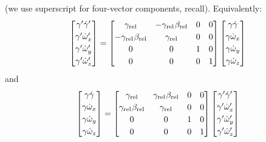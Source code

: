\documentclass[12pt]{article}
\begin{document}
(we use superscript for four-vector components, recall). Equivalently:
\begin{equation*}
\begin{bmatrix}
\gamma^\prime \dot{\gamma}^\prime \\[.25 em]
\gamma^{\prime} \dot{\omega}_x^{\prime} \\[.25 em]
\gamma^{\prime} \dot{\omega}_y^{\prime} \\[.25 em]
\gamma^{\prime} \dot{\omega}_z^{\prime} \\[.1 em]
\end{bmatrix}
=
\begin{bmatrix}
\gamma_{\textrm{rel}} & -\gamma_{\textrm{rel}} \mkern1mu \beta_{\textrm{rel}} & 0 & 0 \\[.25 em]
- \gamma_{\textrm{rel}} \mkern1mu \beta_{\textrm{rel}} & \gamma_{\textrm{rel}} & 0 & 0 \\[.25 em]
0 & 0 & 1 & 0 \\[.25 em]
0 & 0 & 0 & 1
\end{bmatrix}
\begin{bmatrix}
\gamma \dot{\gamma} \\[.25 em]
\gamma \dot{\omega}_x \\[.25 em]
\gamma \dot{\omega}_y \\[.25 em]
\gamma \dot{\omega}_z \\[.1 em]
\end{bmatrix}
\end{equation*}
and
\begin{equation*}
\begin{bmatrix}
\gamma \dot{\gamma} \\[.25 em]
\gamma \dot{\omega}_x \\[.25 em]
\gamma \dot{\omega}_y \\[.25 em]
\gamma \dot{\omega}_z \\[.1 em]
\end{bmatrix}
=
\begin{bmatrix}
\gamma_{\textrm{rel}} & \gamma_{\textrm{rel}} \mkern1mu \beta_{\textrm{rel}} & 0 & 0 \\[.25em]
\gamma_{\textrm{rel}} \mkern1mu \beta_{\textrm{rel}} & \gamma_{\textrm{rel}} & 0 & 0 \\[.25 em]
0 & 0 & 1 & 0 \\[.25 em]
0 & 0 & 0 & 1
\end{bmatrix}
\begin{bmatrix}
\gamma^\prime \dot{\gamma}^\prime \\[.25 em]
\gamma^{\prime} \dot{\omega}_x^{\prime} \\[.25 em]
\gamma^{\prime} \dot{\omega}_y^{\prime} \\[.25 em]
\gamma^{\prime} \dot{\omega}_z^{\prime} \\[.1 em]
\end{bmatrix}
\end{equation*}
\end{document}
